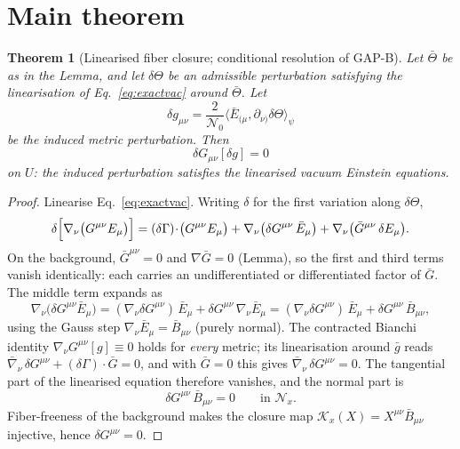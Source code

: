 \documentclass[11pt,a4paper]{article}
\newtheorem{theorem}{Theorem}
\newcommand{\Nzero}{\mathcal N_0}
\newcommand{\avg}[1]{\langle #1\rangle_\psi}
\begin{document}
\section{Main theorem}

\begin{theorem}[Linearised fiber closure; conditional resolution of GAP-B]
Let $\bar\Theta$ be as in the Lemma, and let $\delta\Theta$ be an admissible
perturbation satisfying the linearisation of Eq.~\eqref{eq:exactvac} around
$\bar\Theta$. Let
\begin{equation}
 \delta g_{\mu\nu}
 =\frac{2}{\Nzero}\avg{\bar E_{(\mu},\partial_{\nu)}\delta\Theta}
\end{equation}
be the induced metric perturbation. Then
\begin{equation}
  \boxed{\;\delta G_{\mu\nu}[\delta g]=0\;}
\end{equation}
on $U$: the induced perturbation satisfies the linearised vacuum Einstein
equations.
\end{theorem}

\begin{proof}
Linearise Eq.~\eqref{eq:exactvac}. Writing $\delta$ for the first variation
along $\delta\Theta$,
\begin{equation}
 \delta\Bigl[\nabla_\nu\bigl(G^{\mu\nu}E_\mu\bigr)\Bigr]
 =(\delta\Gamma)\!\cdot\!\bigl(G^{\mu\nu}E_\mu\bigr)
 +\nabla_\nu\bigl(\delta G^{\mu\nu}\,\bar E_\mu\bigr)
 +\nabla_\nu\bigl(\bar G^{\mu\nu}\,\delta E_\mu\bigr).
\end{equation}
On the background, $\bar G^{\mu\nu}=0$ and $\nabla\bar G=0$ (Lemma), so the
first and third terms vanish identically: each carries an undifferentiated or
differentiated factor of $\bar G$. The middle term expands as
\begin{equation}
 \nabla_\nu\bigl(\delta G^{\mu\nu}\bar E_\mu\bigr)
 =(\nabla_\nu\delta G^{\mu\nu})\,\bar E_\mu
 +\delta G^{\mu\nu}\,\nabla_\nu\bar E_\mu
 =(\nabla_\nu\delta G^{\mu\nu})\,\bar E_\mu
 +\delta G^{\mu\nu}\,\bar B_{\mu\nu},
\end{equation}
using the Gauss step $\nabla_\nu\bar E_\mu=\bar B_{\mu\nu}$ (purely normal).
The contracted Bianchi identity $\nabla_\nu G^{\mu\nu}[g]\equiv0$ holds for
\emph{every} metric; its linearisation around $\bar g$ reads
$\bar\nabla_\nu\,\delta G^{\mu\nu}+(\delta\Gamma)\!\cdot\!\bar G=0$, and with
$\bar G=0$ this gives $\bar\nabla_\nu\,\delta G^{\mu\nu}=0$. The tangential
part of the linearised equation therefore vanishes, and the normal part is
\begin{equation}
 \delta G^{\mu\nu}\,\bar B_{\mu\nu}=0
 \qquad\text{in }\mathscr N_x .
\end{equation}
Fiber-freeness of the background makes the closure map
$\mathcal K_x(X)=X^{\mu\nu}\bar B_{\mu\nu}$ injective, hence
$\delta G^{\mu\nu}=0$.
\end{proof}
\end{document}
